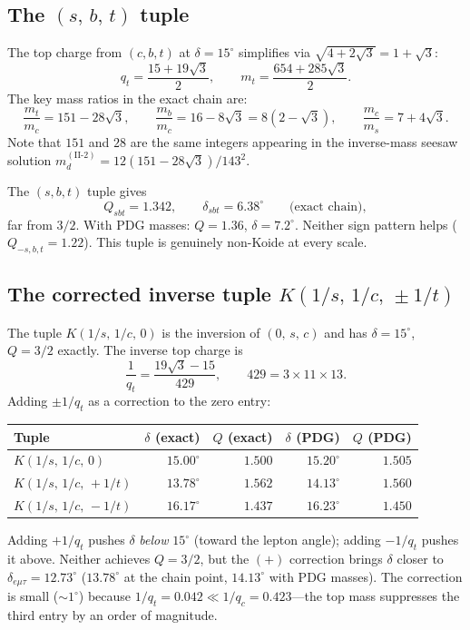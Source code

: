 \documentclass[11pt]{article}
\begin{document}
\subsection{The $(s,\,b,\,t)$ tuple}

The top charge from $(c,b,t)$ at $\delta = 15^\circ$ simplifies
via $\sqrt{4+2\sqrt3} = 1+\sqrt3$:
\[
  q_t = \frac{15+19\sqrt3}{2},
  \qquad
  m_t = \frac{654+285\sqrt3}{2}.
\]
The key mass ratios in the exact chain are:
\[
  \frac{m_t}{m_c} = 151-28\sqrt3,
  \qquad
  \frac{m_b}{m_c} = 16-8\sqrt3 = 8(2-\sqrt3),
  \qquad
  \frac{m_c}{m_s} = 7+4\sqrt3.
\]
Note that $151$ and $28$ are the same integers appearing
in the inverse-mass seesaw solution
$m_d^{(\text{II-2})} = 12(151-28\sqrt3)/143^2$.

The $(s,b,t)$ tuple gives
\[
  Q_{sbt} = 1.342,\qquad \delta_{sbt} = 6.38^\circ
  \qquad\text{(exact chain)},
\]
far from $3/2$. With PDG masses: $Q = 1.36$, $\delta = 7.2^\circ$.
Neither sign pattern helps ($Q_{-s,b,t} = 1.22$).
This tuple is genuinely non-Koide at every scale.

\subsection{The corrected inverse tuple $K(1/s,\,1/c,\,\pm 1/t)$}

The tuple $K(1/s,\,1/c,\,0)$ is the inversion of $(0,\,s,\,c)$
and has $\delta = 15^\circ$, $Q = 3/2$ exactly.
The inverse top charge is
\[
  \frac{1}{q_t} = \frac{19\sqrt3-15}{429},
  \qquad 429 = 3\times 11\times 13.
\]
Adding $\pm 1/q_t$ as a correction to the zero entry:

\begin{center}
\begin{tabular}{@{}l r r r r@{}}
\toprule
Tuple & $\delta$ (exact) & $Q$ (exact) & $\delta$ (PDG) & $Q$ (PDG) \\
\midrule
$K(1/s,\,1/c,\,0)$ & $15.00^\circ$ & $1.500$ & $15.20^\circ$ & $1.505$ \\
$K(1/s,\,1/c,\,+\!1/t)$ & $13.78^\circ$ & $1.562$ & $14.13^\circ$ & $1.560$ \\
$K(1/s,\,1/c,\,-\!1/t)$ & $16.17^\circ$ & $1.437$ & $16.23^\circ$ & $1.450$ \\
\bottomrule
\end{tabular}
\end{center}

\noindent
Adding $+1/q_t$ pushes $\delta$ \emph{below} $15^\circ$ (toward
the lepton angle); adding $-1/q_t$ pushes it above.
Neither achieves $Q=3/2$, but the $(+)$ correction brings $\delta$
closer to $\delta_{e\mu\tau}=12.73^\circ$ ($13.78^\circ$ at the
chain point, $14.13^\circ$ with PDG masses).
The correction is small ($\sim 1^\circ$) because
$1/q_t = 0.042 \ll 1/q_c = 0.423$---the top mass suppresses the
third entry by an order of magnitude.
\end{document}
